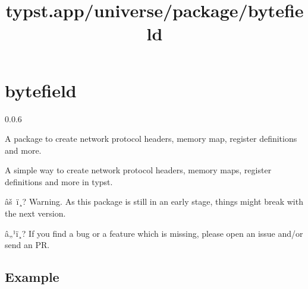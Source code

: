 \title{typst.app/universe/package/bytefield}

\label{banner}
\section{bytefield}\label{bytefield}

{ 0.0.6 }

A package to create network protocol headers, memory map, register
definitions and more.

\label{readme}
A simple way to create network protocol headers, memory maps, register
definitions and more in typst.

âš~ï¸? Warning. As this package is still in an early stage, things might
break with the next version.

â„¹ï¸? If you find a bug or a feature which is missing, please open an
issue and/or send an PR.

\subsection{Example}\label{example}


